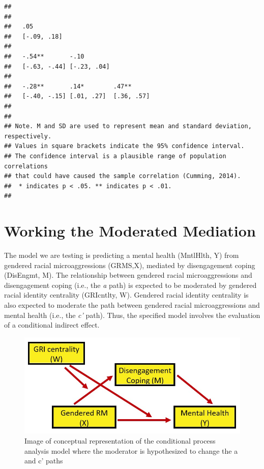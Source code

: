 \documentclass[
  11pt,
]{book}
\begin{document}
\begin{verbatim}
##                                      
##                                      
##   .05                                
##   [-.09, .18]                        
##                                      
##   -.54**       -.10                  
##   [-.63, -.44] [-.23, .04]           
##                                      
##   -.28**       .14*        .47**     
##   [-.40, -.15] [.01, .27]  [.36, .57]
##                                      
## 
## Note. M and SD are used to represent mean and standard deviation, respectively.
## Values in square brackets indicate the 95% confidence interval.
## The confidence interval is a plausible range of population correlations 
## that could have caused the sample correlation (Cumming, 2014).
##  * indicates p < .05. ** indicates p < .01.
## 
\end{verbatim}

\hypertarget{working-the-moderated-mediation}{%
\section{Working the Moderated Mediation}\label{working-the-moderated-mediation}}

The model we are testing is predicting a mental health (MntlHlth, Y) from gendered racial microaggressions (GRMS,X), mediated by disengagement coping (DisEngmt, M). The relationship between gendered racial microaggressions and disengagement coping (i.e., the \emph{a} path) is expected to be moderated by gendered racial identity centrality (GRIcntlty, W). Gendered racial identity centrality is also expected to moderate the path between gendered racial microaggressions and mental health (i.e., the \emph{c'} path). Thus, the specified model involves the evaluation of a conditional indirect effect.

\begin{figure}
\centering
\includegraphics{images/ModMed/LewisModMed.jpg}
\caption{Image of conceptual representation of the conditional process analysis model where the moderator is hypothesized to change the a and c' paths}
\end{figure}
\end{document}
